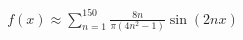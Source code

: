\documentclass[preview]{standalone}
\begin{document}
\begin{align*}
f(x) \approx \sum_{n=1}^{150} \frac{8n}{\pi(4n^2-1)} \sin(2nx)
\end{align*}
\end{document}
